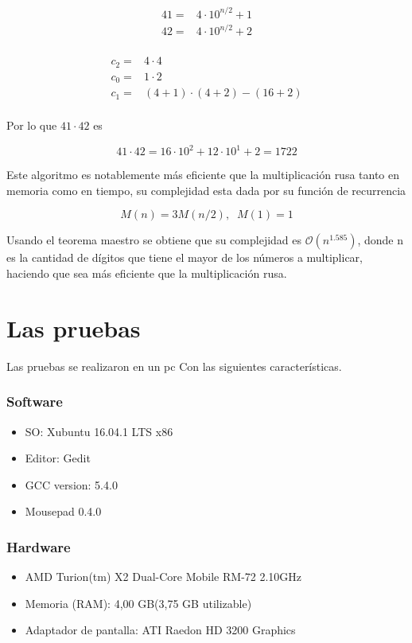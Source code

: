 \documentclass[10pt,journal,compsoc]{IEEEtran}
\begin{document}
\begin{align}
41 =&  4 \cdot 10^{n/2} + 1\\
42 =&  4\cdot  10^{n/2} + 2\\
\end{align}

\begin{align}
c_2  =& 4 \cdot 4\\
c_0  =& 1 \cdot 2\\
c_1 =& (4 + 1) \cdot (4 + 2) - (16 + 2) \\
\end{align}

Por lo que $41 \cdot 42$ es

$$41 \cdot 42 = 16 \cdot 10^2 + 12 \cdot 10^{1} + 2  = 1722$$

Este algoritmo es notablemente más eficiente que la multiplicación rusa tanto en memoria como en tiempo, su complejidad esta dada por su función de recurrencia

$$ M(n) = 3M(n/2), \; \; M(1) = 1 $$

Usando el teorema maestro \cite{AL14} se obtiene que su complejidad es $\mathcal{O}(n^{1.585})$, donde n es la cantidad de dígitos que tiene el mayor de los números a multiplicar, haciendo que sea más eficiente que la multiplicación rusa.


\section{Las pruebas}

Las pruebas se realizaron en un pc Con las siguientes características.

\subsubsection*{Software}
\begin{itemize}
\item SO: Xubuntu 16.04.1 LTS x86
\item Editor: Gedit
\item GCC version: 5.4.0 
\item Mousepad 0.4.0
\end{itemize}

\subsubsection*{Hardware}
\begin{itemize}
\item AMD Turion(tm) X2 Dual-Core Mobile RM-72 2.10GHz
\item Memoria (RAM): 4,00 GB(3,75 GB utilizable)
\item Adaptador de pantalla: ATI Raedon HD 3200 Graphics
\end{itemize}
\end{document}
